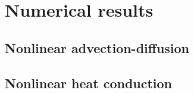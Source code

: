 \documentclass[review]{siamart}
\begin{document}


\section{Numerical results}\label{sec:numerics_nonlin}

\subsection{Nonlinear advection-diffusion}\label{sec:numerics_nonlin:advdiff}



\subsection{Nonlinear heat conduction}\label{sec:numerics_nonlin:heat}
\end{document}
